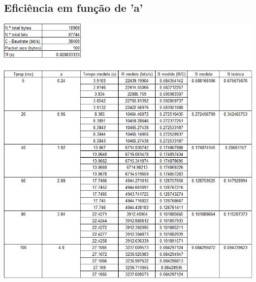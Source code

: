 \documentclass[a4paper,11pt,portuguese]{article}
\begin{document}













\subsection{Eficiência em função de 'a'}
\includegraphics[scale=0.6]{./imgs/grapha.png}
\end{document}
